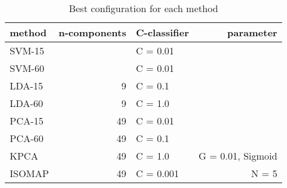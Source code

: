 \begin{table}[htb!]   
    \centering
    \begin{tabular}{lrlr}
        \toprule
        method & n-components & C-classifier & parameter \\
        \midrule
        SVM-15 &  & C = 0.01 &  \\
        SVM-60 &  & C = 0.01 &  \\
        LDA-15 & 9 & C = 0.1 &  \\
        LDA-60 & 9 & C = 1.0 &  \\
        PCA-15 & 49 & C = 0.01 &  \\
        PCA-60 & 49 & C = 0.1 &   \\
        KPCA & 49 & C = 1.0 & G = 0.01, Sigmoid \\
        ISOMAP & 49 & C = 0.001 & N = 5 \\
        \bottomrule
    \end{tabular}
    \caption{Best configuration for each method}
    \label{tab:best-configuration}
\end{table}